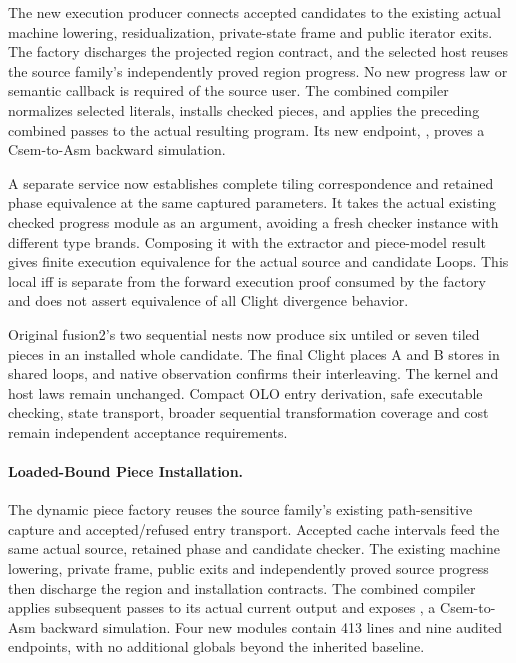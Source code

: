 The new execution producer connects accepted candidates to the existing actual
machine lowering, residualization, private-state frame and public iterator
exits. The factory discharges the projected region contract, and the selected
host reuses the source family's independently proved region progress. No new
progress law or semantic callback is required of the source user. The combined
compiler normalizes selected literals, installs checked pieces, and applies the
preceding combined passes to the actual resulting program. Its new endpoint,
, proves
a Csem-to-Asm backward simulation.

A separate service now establishes complete tiling correspondence and retained
phase equivalence at the same captured parameters. It takes the actual existing
checked progress module as an argument, avoiding a fresh checker instance with
different type brands. Composing it with the extractor and piece-model result
gives finite execution equivalence for the actual source and candidate Loops.
This local iff is separate from the forward execution proof consumed by the
factory and does not assert equivalence of all Clight divergence behavior.

Original fusion2's two sequential nests now produce six untiled or seven tiled
pieces in an installed whole candidate. The final Clight places A and B stores
in shared loops, and native observation confirms their interleaving. The kernel
and host laws remain unchanged. Compact OLO entry derivation, safe executable
checking, state transport, broader sequential transformation coverage and cost
remain independent acceptance requirements.


\paragraph{Loaded-Bound Piece Installation.}
The dynamic piece factory reuses the source family's existing path-sensitive
capture and accepted/refused entry transport. Accepted cache intervals feed the
same actual source, retained phase and candidate checker. The existing machine
lowering, private frame, public exits and independently proved source progress
then discharge the region and installation contracts. The combined compiler
applies subsequent passes to its actual current output and exposes
, a Csem-to-Asm
backward simulation. Four new modules contain 413 lines and nine audited
endpoints, with no additional globals beyond the inherited baseline.

